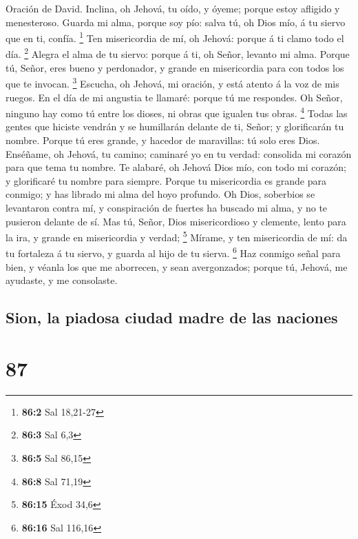  Oración de David. Inclina, oh Jehová, tu oído, y óyeme;
porque estoy afligido y menesteroso.  Guarda mi alma, porque
soy pío: salva tú, oh Dios mío, á tu siervo que en ti, confía.
\footnote{\textbf{86:2} Sal 18,21-27}  Ten misericordia de
mí, oh Jehová: porque á ti clamo todo el día. \footnote{\textbf{86:3}
  Sal 6,3}  Alegra el alma de tu siervo: porque á ti, oh
Señor, levanto mi alma.  Porque tú, Señor, eres bueno y
perdonador, y grande en misericordia para con todos los que te invocan.
\footnote{\textbf{86:5} Sal 86,15}  Escucha, oh Jehová, mi
oración, y está atento á la voz de mis ruegos.  En el día de
mi angustia te llamaré: porque tú me respondes.  Oh Señor,
ninguno hay como tú entre los dioses, ni obras que igualen tus obras.
\footnote{\textbf{86:8} Sal 71,19}  Todas las gentes que
hiciste vendrán y se humillarán delante de ti, Señor; y glorificarán tu
nombre.  Porque tú eres grande, y hacedor de maravillas: tú
solo eres Dios.  Enséñame, oh Jehová, tu camino; caminaré
yo en tu verdad: consolida mi corazón para que tema tu nombre.
 Te alabaré, oh Jehová Dios mío, con todo mi corazón; y
glorificaré tu nombre para siempre.  Porque tu misericordia
es grande para conmigo; y has librado mi alma del hoyo profundo.
 Oh Dios, soberbios se levantaron contra mí, y conspiración
de fuertes ha buscado mi alma, y no te pusieron delante de sí.
 Mas tú, Señor, Dios misericordioso y clemente, lento para
la ira, y grande en misericordia y verdad; \footnote{\textbf{86:15} Éxod
  34,6}  Mírame, y ten misericordia de mí: da tu fortaleza
á tu siervo, y guarda al hijo de tu sierva. \footnote{\textbf{86:16} Sal
  116,16}  Haz conmigo señal para bien, y véanla los que me
aborrecen, y sean avergonzados; porque tú, Jehová, me ayudaste, y me
consolaste.

\hypertarget{sion-la-piadosa-ciudad-madre-de-las-naciones}{%
\subsection{Sion, la piadosa ciudad madre de las
naciones}\label{sion-la-piadosa-ciudad-madre-de-las-naciones}}

\hypertarget{section-86}{%
\section{87}\label{section-86}}

